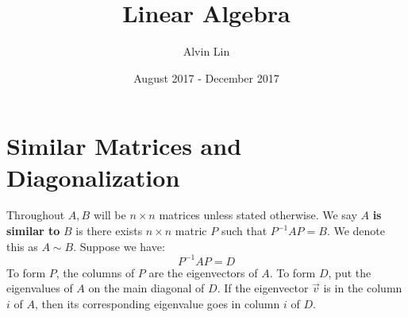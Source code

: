 \documentclass{math}
\title{Linear Algebra}
\author{Alvin Lin}
\date{August 2017 - December 2017}
\begin{document}
\maketitle

\section*{Similar Matrices and Diagonalization}
Throughout \( A,B \) will be \( n\times n \) matrices unless stated otherwise.
We say \( A \) \textbf{is similar to} \( B \) is there exists \( n\times n \)
matric \( P \) such that \( P^{-1}AP = B \). We denote this as \( A\sim B \).
Suppose we have:
\[ P^{-1}AP = D \]
To form \( P \), the columns of \( P \) are the eigenvectors of \( A \). To
form \( D \), put the eigenvalues of \( A \) on the main diagonal of \( D \).
If the eigenvector \( \vec{v} \) is in the column \( i \) of \( A \), then its
corresponding eigenvalue goes in column \( i \) of \( D \).
\end{document}
